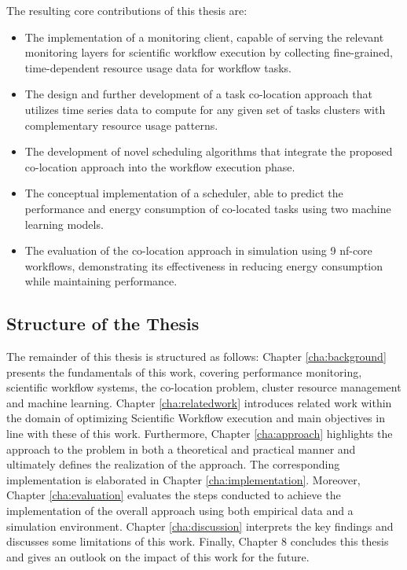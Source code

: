 The resulting core contributions of this thesis are:
\begin{itemize}
    \item The implementation of a monitoring client, capable of serving the relevant monitoring layers for scientific workflow execution by collecting fine-grained, time-dependent resource usage data for workflow tasks.
    \item The design and further development of a task co-location approach that utilizes time series data to compute for any given set of tasks clusters with complementary resource usage patterns.
    \item The development of novel scheduling algorithms that integrate the proposed co-location approach into the workflow execution phase.
    \item The conceptual implementation of a scheduler, able to predict the performance and energy consumption of co-located tasks using two machine learning models.
    \item The evaluation of the co-location approach in simulation using 9 nf-core workflows, demonstrating its effectiveness in reducing energy consumption while maintaining performance.
\end{itemize}
\subsection{Structure of the Thesis}
\label{subse:structure_of_the_thesis}
The remainder of this thesis is structured as follows: Chapter \ref{cha:background} presents the fundamentals of this work, covering performance monitoring, scientific workflow systems, the co-location problem, cluster resource management and machine learning. Chapter \ref{cha:relatedwork} introduces related work within the domain of optimizing Scientific Workflow execution and main objectives in line with these of this work. Furthermore, Chapter \ref{cha:approach} highlights the approach to the problem in both a theoretical and practical manner and ultimately defines the realization of the approach. The corresponding implementation is elaborated in Chapter \ref{cha:implementation}. Moreover, Chapter \ref{cha:evaluation} evaluates the steps conducted to achieve the implementation of the overall approach using both empirical data and a simulation environment. Chapter \ref{cha:discussion} interprets the key findings and discusses some limitations of this work. Finally, Chapter 8 concludes this thesis and gives an outlook on the impact of this work for the future.
